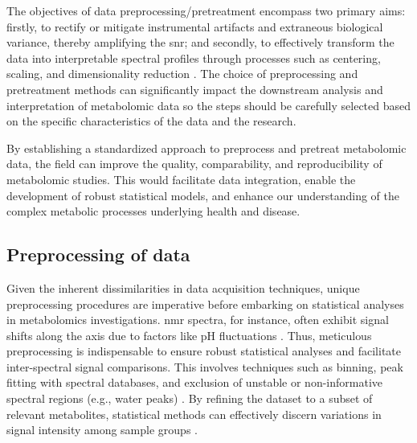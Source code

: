 \documentclass[ENG, BIB]{TFUOC}%
\begin{document}
The objectives of data preprocessing/pretreatment encompass two primary aims: firstly, to rectify or mitigate instrumental artifacts and extraneous biological variance, thereby amplifying the \gls{snr}; and secondly, to effectively transform the data into interpretable spectral profiles through processes such as centering, scaling, and dimensionality reduction \cite{sunPretreatingNormalizingMetabolomics2024,martinPepsNMR1HNMR2018}. The choice of preprocessing and pretreatment methods can significantly impact the downstream analysis and interpretation of metabolomic data \cite{karamanPreprocessingPretreatmentMetabolomics2017} so the steps should be carefully selected based on the specific characteristics of the data and the research.

By establishing a standardized approach to preprocess and pretreat metabolomic data, the field can improve the quality, comparability, and reproducibility of metabolomic studies. This would facilitate data integration, enable the development of robust statistical models, and enhance our understanding of the complex metabolic processes underlying health and disease.


\subsection{Preprocessing of data}

Given the inherent dissimilarities in data acquisition techniques, unique preprocessing procedures are imperative before embarking on statistical analyses in metabolomics investigations. \gls{nmr} spectra, for instance, often exhibit signal shifts along the axis due to factors like pH fluctuations \cite{bhinderwalaChemicalShiftVariations2022}. Thus, meticulous preprocessing is indispensable to ensure robust statistical analyses and facilitate inter-spectral signal comparisons. This involves techniques such as binning, peak fitting with spectral databases, and exclusion of unstable or non-informative spectral regions (e.g., water peaks) \cite{chenGuideMetabolomicsAnalysis2022a,sunPretreatingNormalizingMetabolomics2024,stanstrupMetaRbolomicsToolboxBioconductor2019}. By refining the dataset to a subset of relevant metabolites, statistical methods can effectively discern variations in signal intensity among sample groups \cite{qiuSmallMoleculeMetabolites2023}.
\end{document}
